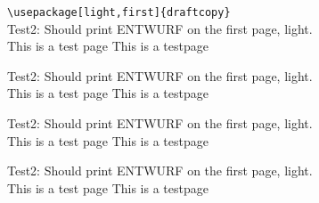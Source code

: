 \documentclass[a4paper,german]{article}
\newcommand{\xx}{
Test2: Should print ENTWURF on the first page, light.\\
This is a test page \thepage \vfill
This is a testpage \thepage \newpage
}
\begin{document}
\verb|\usepackage[light,first]{draftcopy}|\\
\xx\xx\xx\xx
\end{document}
